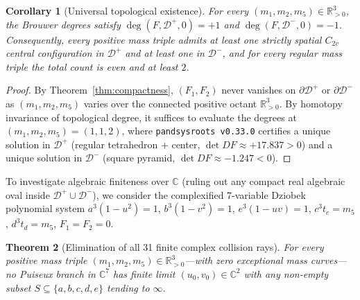\documentclass[11pt,a4paper]{amsart}
\newtheorem{theorem}{Theorem}[section]
\newtheorem{corollary}[theorem]{Corollary}
\theoremstyle{definition}
\theoremstyle{remark}
\newcommand{\R}{\mathbb{R}}
\newcommand{\C}{\mathbb{C}}
\begin{document}
\begin{corollary}[Universal topological existence]\label{cor:existence}
For every $(m_1, m_2, m_5) \in \R_{>0}^3$, the Brouwer degrees satisfy
$\deg(F, \mathcal{D}^+, 0) = +1$ and $\deg(F, \mathcal{D}^-, 0) = -1$.
Consequently, every positive mass triple admits at least one strictly spatial $C_{2v}$
central configuration in $\mathcal{D}^+$ and at least one in $\mathcal{D}^-$, and for
every regular mass triple the total count is even and at least $2$.
\end{corollary}

\begin{proof}
By Theorem~\ref{thm:compactness}, $(F_1, F_2)$ never vanishes on $\partial \mathcal{D}^+$
or $\partial \mathcal{D}^-$ as $(m_1, m_2, m_5)$ varies over the connected positive
octant $\R_{>0}^3$. By homotopy invariance of topological degree, it suffices to evaluate
the degrees at $(m_1, m_2, m_5) = (1, 1, 2)$, where \texttt{pandsysroots v0.33.0}
certifies a unique solution in $\mathcal{D}^+$ (regular tetrahedron + center,
$\det DF \approx +17.837 > 0$) and a unique solution in $\mathcal{D}^-$ (square pyramid,
$\det DF \approx -1.247 < 0$).
\end{proof}

To investigate algebraic finiteness over $\C$ (ruling out any compact real algebraic
oval inside $\mathcal{D}^+ \cup \mathcal{D}^-$), we consider the complexified 7-variable
Dziobek polynomial system
$a^3(1-u^2)=1$, $b^3(1-v^2)=1$, $e^3(1-uv)=1$, $c^3 t_c = m_5$, $d^3 t_d = m_5$,
$F_1 = F_2 = 0$.

\begin{theorem}[Elimination of all 31 finite complex collision rays]\label{thm:complex-rays}
For every positive mass triple $(m_1, m_2, m_5) \in \R_{>0}^3$---with zero exceptional
mass curves---no Puiseux branch in $\C^7$ has finite limit $(u_0, v_0) \in \C^2$ with
any non-empty subset $S \subseteq \{a,b,c,d,e\}$ tending to $\infty$.
\end{theorem}
\end{document}
